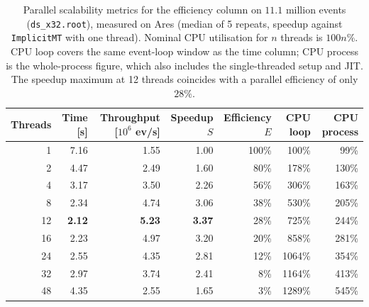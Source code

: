 \begin{table}[htbp]
\centering
\caption{Parallel scalability metrics for the efficiency column on $11.1$ million events (\texttt{ds\_x32.root}), measured on Ares (median of 5 repeats, speedup against \texttt{ImplicitMT} with one thread). Nominal CPU utilisation for $n$ threads is $100n\%$. CPU loop covers the same event-loop window as the time column; CPU process is the whole-process figure, which also includes the single-threaded setup and JIT. The speedup maximum at 12 threads coincides with a parallel efficiency of only $28\%$.}
\label{tab:scalability-efficiency}
\begin{tabular}{rrrrrrr}
\toprule
Threads & Time [s] & Throughput [$10^6$ ev/s] & Speedup $S$ & Efficiency $E$ & CPU loop & CPU process \\
\midrule
 1 & 7.16 & 1.55 & 1.00 & 100\% & 100\% & 99\% \\
 2 & 4.47 & 2.49 & 1.60 & 80\% & 178\% & 130\% \\
 4 & 3.17 & 3.50 & 2.26 & 56\% & 306\% & 163\% \\
 8 & 2.34 & 4.74 & 3.06 & 38\% & 530\% & 205\% \\
12 & \textbf{2.12} & \textbf{5.23} & \textbf{3.37} & 28\% & 725\% & 244\% \\
16 & 2.23 & 4.97 & 3.20 & 20\% & 858\% & 281\% \\
24 & 2.55 & 4.35 & 2.81 & 12\% & 1064\% & 354\% \\
32 & 2.97 & 3.74 & 2.41 & 8\% & 1164\% & 413\% \\
48 & 4.35 & 2.55 & 1.65 & 3\% & 1289\% & 545\% \\
\bottomrule
\end{tabular}
\end{table}
